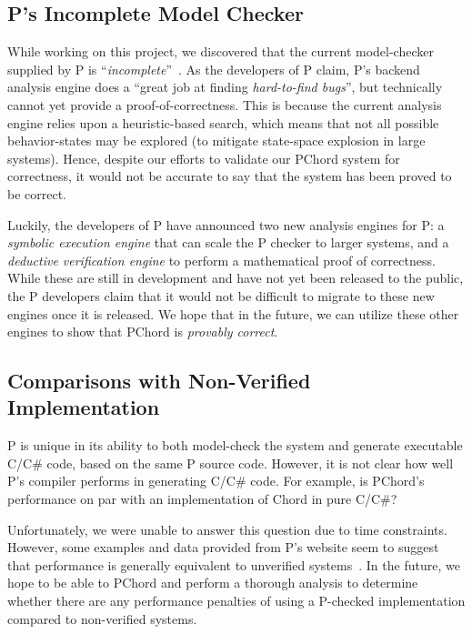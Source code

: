 \documentclass[conference]{IEEEtran}
\begin{document}
\subsection{P's Incomplete Model Checker}
\label{sec:incomplete-model-checker}
While working on this project, we discovered that the current model-checker supplied by P is ``\textit{incomplete}''~\cite{p_developers_formal_2023}. As the developers of P claim, P's backend analysis engine does a ``great job at finding \textit{hard-to-find bugs}'', but technically cannot yet provide a proof-of-correctness. This is because the current analysis engine relies upon a heuristic-based search, which means that not all possible behavior-states may be explored (to mitigate state-space explosion in large systems). Hence, despite our efforts to validate our PChord system for correctness, it would not be accurate to say that the system has been proved to be correct.

Luckily, the developers of P have announced two new analysis engines for P: a \textit{symbolic execution engine} that can scale the P checker to larger systems, and a \textit{deductive verification engine} to perform a mathematical proof of correctness. While these are still in development and have not yet been released to the public, the P developers claim that it would not be difficult to migrate to these new engines once it is released. We hope that in the future, we can utilize these other engines to show that PChord is \textit{provably correct}.

\subsection{Comparisons with Non-Verified Implementation}
P is unique in its ability to both model-check the system and generate executable C/C\# code, based on the same P source code. However, it is not clear how well P's compiler performs in generating C/C\# code. For example, is PChord's performance on par with an implementation of Chord in pure C/C\#?

Unfortunately, we were unable to answer this question due to time constraints. However, some examples and data provided from P's website seem to suggest that performance is generally equivalent to unverified systems~\cite{p_developers_formal_2023}. In the future, we hope to be able to PChord and perform a thorough analysis to determine whether there are any performance penalties of using a P-checked implementation compared to non-verified systems.



\end{document}
